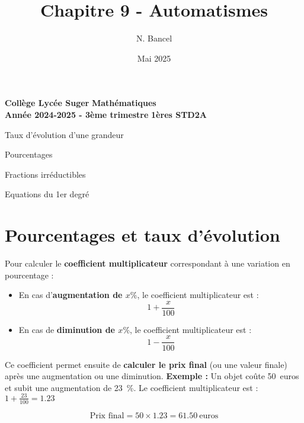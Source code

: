 \documentclass[a4paper,12pt]{article}
\title{Chapitre 9 - Automatismes}
\author{N. Bancel}
\date{Mai 2025}
\begin{document}
\textbf{Collège Lycée Suger}
\hfill
\textbf{Mathématiques} \\

\textbf{Année 2024-2025 - 3ème trimestre}
\hfill
\textbf{1ères STD2A} \par

{\let\newpage\relax\maketitle}


\begin{tcolorbox}[colback=blue!10!white, colframe=blue!75!black, title=Concepts importants à retenir]
  \begin{compactitem}
    \item Taux d'évolution d'une grandeur
    \item Pourcentages
    \item Fractions irréductibles
    \item Equations du 1er degré
  \end{compactitem}
\end{tcolorbox}

\section*{Pourcentages et taux d'évolution}

  \begin{tcolorbox}[colback=blue!5!white, colframe=blue!75!black, title=Méthode]
    Pour calculer le \textbf{coefficient multiplicateur} correspondant à une variation en pourcentage :
    \begin{itemize}
        \item En cas d'\textbf{augmentation de $x\%$}, le coefficient multiplicateur est : \[ 1 + \frac{x}{100} \]
        \item En cas de \textbf{diminution de $x\%$}, le coefficient multiplicateur est : \[ 1 - \frac{x}{100} \]
    \end{itemize}

    Ce coefficient permet ensuite de \textbf{calculer le prix final} (ou une valeur finale) après une augmentation ou une diminution.
    \textbf{Exemple :} Un objet coûte 50~euros et subit une augmentation de 23~\%. Le coefficient multiplicateur est : $1 + \frac{23}{100} = 1.23$

    \[
    \text{Prix final} = 50 \times 1.23 = 61.50~\text{euros}
    \]
    \end{tcolorbox}
\end{document}
